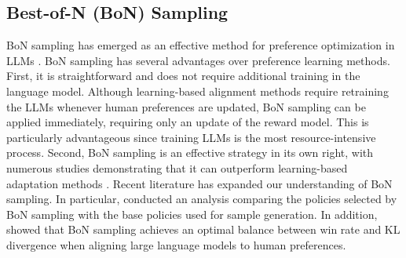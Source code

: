 
\subsection{Best-of-N (BoN) Sampling}
\label{pre:bon}

BoN sampling has emerged as an effective method for preference optimization in LLMs \citep{stiennon2020,nakano2022webgpt}. BoN sampling has several advantages over preference learning methods. First, it is straightforward and does not require additional training in the language model. Although learning-based alignment methods require retraining the LLMs whenever human preferences are updated, BoN sampling can be applied immediately, requiring only an update of the reward model. This is particularly advantageous since training LLMs is the most resource-intensive process. Second, BoN sampling is an effective strategy in its own right, with numerous studies demonstrating that it can outperform learning-based adaptation methods \citep{pmlr-v202-gao23h}. Recent literature has expanded our understanding of BoN sampling. In particular, \citet{beirami2024theoretical} conducted an analysis comparing the policies selected by BoN sampling with the base policies used for sample generation. In addition, \citet{gui2024bonbon} showed that BoN sampling achieves an optimal balance between win rate and KL divergence when aligning large language models to human preferences. 

